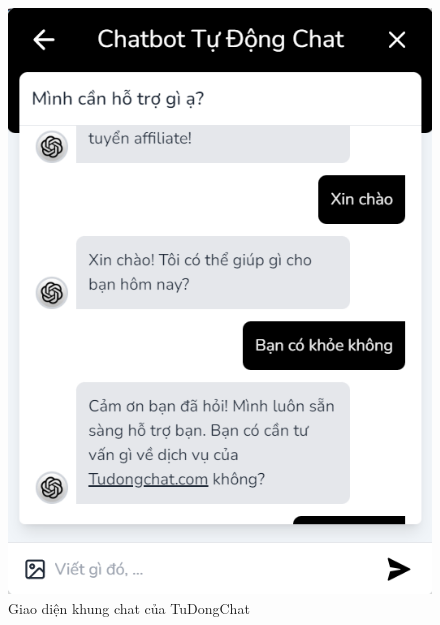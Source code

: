\begin{figure}[H]
    \centering
    \includegraphics[width=0.5\linewidth]{Images/uiTuDongChat3.png}
    \vspace{0.5cm}
    \caption{Giao diện khung chat của TuDongChat}
    \label{fig:enter-label}
\end{figure}
